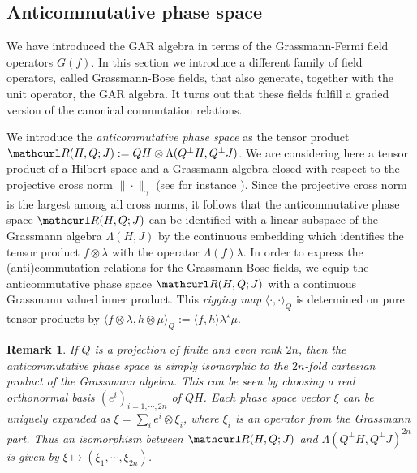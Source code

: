 \documentclass[pra,twoside,amsmath,amsfonts,amssymb,superscriptaddress,showpacs]{revtex4}
\newtheorem{rem}[thm]{Remark}
\def\9#1{{\mathcurl #1}}
\newcommand{\SPROD}[2]{\langle{#1},{#2}\rangle}
\newcommand{\RIGG}[3]{{\langle}{#1},{#2}{\rangle}_{#3}}
\newcommand{\GR}[2]{\Lambda(#1,#2)}
\newcommand{\PHSP}[3]{\9R(#1,#3;#2)}
\newcommand{\PCN}[1]{\|#1\|_\gamma}
\begin{document}
\subsection{Anticommutative phase space}
\label{subsec:antisym-phase-space}
We have introduced the GAR algebra in terms of the Grassmann-Fermi field operators $G(f)$. In this
section we introduce a different family of field operators, called Grassmann-Bose fields, that also
generate, together with the unit operator, the GAR algebra. It turns out that these fields 
fulfill a graded version of the canonical commutation relations. 

We introduce the {\em anticommutative phase space} as the tensor
product $\PHSP{H}{J}{Q}:=QH\otimes\GR{Q^\perp H}{Q^\perp J}$. We are considering here a tensor
product of a Hilbert space and a Grassmann algebra closed with respect to
the projective cross norm $\PCN{\cdot}$ (see for instance \cite{Tak02}). Since the projective cross
norm is the largest among all
cross norms, it follows that the anticommutative phase space $\PHSP{H}{J}{Q}$
can be identified with a linear subspace of
the Grassmann algebra $\GR{H}{J}$ by the continuous embedding which identifies the tensor
product $f\otimes\lambda$ with the operator $\Lambda(f)\lambda$. In order to express the
(anti)commutation relations for the Grassmann-Bose fields, we equip the anticommutative phase space
$\PHSP{H}{J}{Q}$ with a continuous Grassmann valued inner product. This {\em rigging
map} $\RIGG{\cdot}{\cdot}{Q}$ is determined on pure tensor products by
$\RIGG{f\otimes\lambda}{h\otimes\mu}{Q}:=\SPROD{f}{h}\lambda^\star\mu$. 

\begin{rem}\em
If $Q$ is a projection of finite and even rank $2n$, then the anticommutative phase space is simply
isomorphic to the $2n$-fold cartesian product of the Grassmann algebra. This can be seen by
choosing a real orthonormal basis $(e^i)_{i=1,\cdots,2n}$ of $QH$. Each phase space vector $\xi$
can be uniquely expanded as $\xi=\sum_i e^i\otimes \xi_i$, where $\xi_i$ is an operator from the
Grassmann part. Thus an isomorphism between $\PHSP{H}{J}{Q}$ and $\GR{Q^\perp H}{Q^\perp J}^{2n}$
is given by $\xi\mapsto(\xi_1,\cdots,\xi_{2n})$.  
\end{rem}
\end{document}
